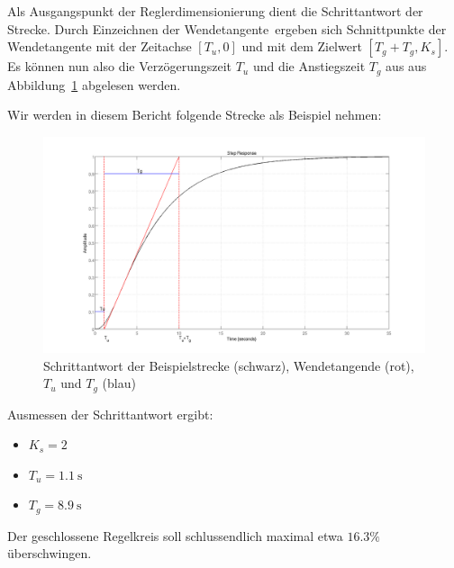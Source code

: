 Als  Ausgangspunkt  der  Reglerdimensionierung dient  die  Schrittantwort  der
Strecke. Durch  Einzeichnen  der Wendetangente~\footnotemark[1]  ergeben  sich
Schnittpunkte  der  Wendetangente mit  der  Zeitachse  $[T_u,0]$ und  mit  dem
Zielwert $[T_g+T_g,K_s]$.   Es k\"onnen nun also  die Verz\"ogerungszeit $T_u$
und die  Anstiegszeit $T_g$  aus aus  Abbildung~\ref{fig:plant_step} abgelesen
werden.


Wir werden in diesem Bericht folgende Strecke als Beispiel nehmen:
\begin{figure}[h! width=\pagewidth]
    \includegraphics[width=\textwidth]{images/streckeSchrittantwort.png}
    \caption{%
    Schrittantwort der  Beispielstrecke (schwarz), Wendetangende  (rot), $T_u$
    und $T_g$ (blau)
    }
    \label{fig:plant_step}
\end{figure}

Ausmessen der Schrittantwort ergibt:
\begin{itemize}
    \item
        $K_s = 2$~\footnotemark[2]
    \item
        $T_u = \SI{1.1}{\second}$
    \item
        $T_g = \SI{8.9}{\second}$
\end{itemize}


Der  geschlossene   Regelkreis  soll  schlussendlich  maximal   etwa  $16.3\%$
\"uberschwingen.

